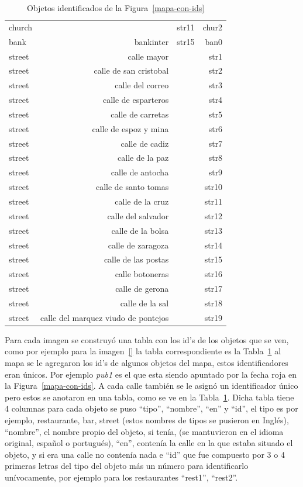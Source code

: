 \begin{table}[!t]
\begin{small}
\begin{center}
\begin{tabular}{|l|r|r|r|}
church & & str11 & chur2\\
bank & bankinter & str15 & ban0\\
street & calle mayor & & str1 \\
street & calle de san cristobal & & str2\\
street & calle del correo & & str3\\
street & calle de esparteros & & str4\\
street & calle de carretas & & str5\\
street & calle de espoz y mina & & str6\\
street & calle de cadiz & & str7\\
street & calle de la paz & & str8\\
street & calle de antocha & & str9\\
street & calle de santo tomas & & str10\\
street & calle de la cruz & & str11\\
street & calle del salvador & & str12\\
street & calle de la bolsa & & str13\\
street & calle de zaragoza & & str14\\
street & calle de las postas & & str15\\
street & calle botoneras & & str16\\
street & calle de gerona & & str17\\
street & calle de la sal & & str18\\
street & calle del marquez viudo de pontejos & & str19\\
\hline
\end{tabular}
\caption{Objetos identificados de la Figura~\ref{mapa-con-ids}\label{tabla-ids}}
\vspace*{-.5cm}
\end{center}
\end{small}
\end{table}

Para cada imagen se construy\'o una tabla con los id's de los objetos que se ven, como por ejemplo para la imagen~\ref{} la tabla correspondiente es la Tabla~\ref{tabla-ids} al mapa se le agregaron los id's de algunos objetos del mapa, estos identificadores eran \'unicos. Por ejemplo {\it pub1} es el que esta siendo apuntado por la fecha roja en la Figura~\ref{mapa-con-ids}. A cada calle tambi\'en se le asign\'o un identificador \'unico pero estos se anotaron en una tabla, como se ve en la Tabla~\ref{tabla-ids}. Dicha tabla tiene 4 columnas para cada objeto se puso ``tipo'', ``nombre'', ``en'' y ``id'', el tipo es por ejemplo, restaurante, bar, street (estos nombres de tipos se pusieron en Ingl\'es), ``nombre'', el nombre propio del objeto, si ten\'ia, (se mantuvieron en el idioma original, espa\~nol o portugu\'es), ``en'', conten\'ia la calle en la que estaba situado el objeto, y si era una calle no conten\'ia nada e ``id'' que fue compuesto por 3 o 4 primeras letras del tipo del objeto m\'as un n\'umero para identificarlo un\'ivocamente, por ejemplo para los restaurantes ``rest1'', ``rest2''.\\

